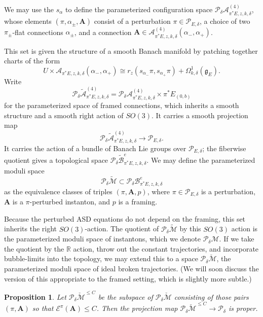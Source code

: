 \documentclass[10pt,a4paper]{amsart}
\newcommand{\pE}{\pi^* \! E}
\newtheorem{proposition}[theorem]{Proposition}
\theoremstyle{definition}
\theoremstyle{remark}
\numberwithin{figure}{qchap}
\begin{document}
We may use the $s_\alpha$ to define the parameterized configuration space $\mathcal P_\delta \mathcal A^{(4)}_{\pE,z,k,\delta}$, whose elements $(\pi, \alpha_\pm, \mathbf{A})$ consist of a perturbation $\pi \in \mathcal P_{E,\delta}$, a choice of two $\pi_\pm$-flat connections $\alpha_\pm$, and a connection $\mathbf{A} \in \mathcal A^{(4)}_{\pE,z,k,\delta}(\alpha_-, \alpha_+)$.

This set is given the structure of a smooth Banach manifold by patching together charts of the form $$U \times \mathcal A_{\pE,z,k,\delta}(\alpha_-,\alpha_+) \cong r_z(s_{\alpha_-} \pi, s_{\alpha_+} \pi) + \Omega^1_{k,\delta}(\mathfrak g_E).$$ Write $$\mathcal P_\delta \widetilde{\mathcal A}^{(4)}_{\pE,z,k,\delta} = \mathcal P_\delta \mathcal A^{(4)}_{\pE,z,k,\delta} \times \pE_{(0,b)}$$ for the parameterized space of framed connections, which inherits a smooth structure and a smooth right action of $SO(3)$. It carries a smooth projection map 
$$\mathcal P_{\delta} \widetilde{\mathcal A}^{(4)}_{\pE,z,k,\delta} \to \mathcal P_{E,\delta}.$$
It carries the action of a bundle of Banach Lie groups over $\mathcal P_{E,\delta}$; the fiberwise quotient gives a topological space $\mathcal P_{\delta} \widetilde{\mathcal B}^e_{\pE,z,k,\delta}$. We may define the parameterized moduli space 
$$\mathcal P_{\delta} \widetilde{\mathcal M} \subset \mathcal P_{\delta} \mathcal B^e_{\pE,z,k,\delta}$$ 
as the equivalence classes of triples $(\pi, \mathbf{A},p)$, where $\pi \in \mathcal P_{E,\delta}$ is a perturbation, $\mathbf{A}$ is a $\pi$-perturbed instanton, and $p$ is a framing. 

Because the perturbed ASD equations do not depend on the framing, this set inherits the right $SO(3)$-action. The quotient of $\mathcal P_{\delta} \widetilde{\mathcal M}$ by this $SO(3)$ action is the parameterized moduli space of instantons, which we denote $\mathcal P_\delta \mathcal M$. If we take the quotient by the $\mathbb R$ action, throw out the constant trajectories, and incorporate bubble-limits into the topology, we may extend this to a space $\mathcal P_\delta \check{\mathcal M}$, the parameterized moduli space of ideal broken trajectories. (We will soon discuss the version of this appropriate to the framed setting, which is slightly more subtle.)

\begin{proposition}\label{properflowlines}Let $\mathcal P_{\delta} \check{\mathcal M}^{\leq C}$ be the subspace of $\mathcal P_{\delta} \check{\mathcal M}$ consisting of those pairs $(\pi, \mathbf{A})$ so that $\mathcal E^\pi(\mathbf{A}) \leq C$. Then the projection map $\mathcal P_{\delta} \check{\mathcal M}^{\leq C} \to \mathcal P_{\delta}$ is proper.
\end{proposition}
\end{document}
